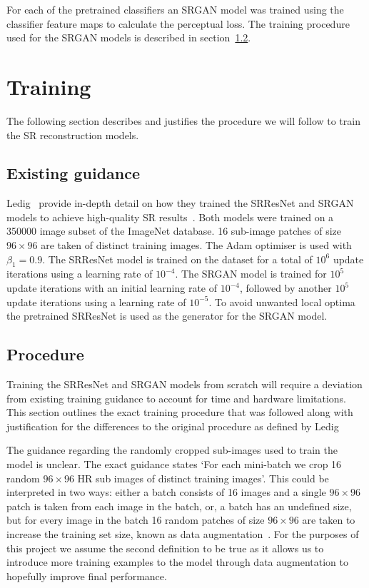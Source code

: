 For each of the pretrained classifiers an SRGAN model was trained using the classifier feature maps to calculate the perceptual loss. The training procedure used for the SRGAN models is described in section~\ref{subsec:procedure}.

\section{Training}
The following section describes and justifies the procedure we will follow to train the SR reconstruction models.

\subsection{Existing guidance}
Ledig \etal\ provide in-depth detail on how they trained the SRResNet and SRGAN models to achieve high-quality SR results~\cite{srgan}. Both models were trained on a 350000 image subset of the ImageNet database. 16 sub-image patches of size $96 \times 96$ are taken of distinct training images. The Adam optimiser is used with $\beta_1 = 0.9$. The SRResNet model is trained on the dataset for a total of $10^6$ update iterations using a learning rate of $10^{-4}$. The SRGAN model is trained for $10^5$ update iterations with an initial learning rate of $10^{-4}$, followed by another $10^5$ update iterations using a learning rate of $10^{-5}$. To avoid unwanted local optima the pretrained SRResNet is used as the generator for the SRGAN model.

\subsection{Procedure}\label{subsec:procedure}
Training the SRResNet and SRGAN models from scratch will require a deviation from existing training guidance to account for time and hardware limitations. This section outlines the exact training procedure that was followed along with justification for the differences to the original procedure as defined by Ledig \etal

The guidance regarding the randomly cropped sub-images used to train the model is unclear. The exact guidance states `For each mini-batch we crop 16 random $96 \times 96$ HR sub images of distinct training images'. This could be interpreted in two ways: either a batch consists of 16 images and a single $96 \times 96$ patch is taken from each image in the batch, or, a batch has an undefined size, but for every image in the batch 16 random patches of size $96 \times 96$ are taken to increase the training set size, known as data augmentation~\cite{dataAugmentation}. For the purposes of this project we assume the second definition to be true as it allows us to introduce more training examples to the model through data augmentation to hopefully improve final performance.

